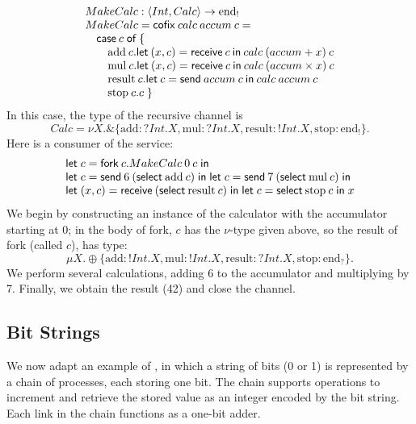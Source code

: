 \documentclass[orivec,envcountsame]{llncs}
\makeatletter
\newcommand{\with}{\mathbin\binampersand}
\newcommand{\gvout}[2]{{!#1.#2}}
\newcommand{\gvin}[2]{{?#1.#2}}
\newcommand{\uto}{\ensuremath{\rightarrow}}
\newcommand{\outterm}{\mathrm{end}_!}
\newcommand{\interm}{\mathrm{end}_?}
\newcommand{\mkwd}[1]{\mathsf{#1}}
\newcommand{\tkwd}[1]{\textsf{#1}}
\newcommand{\clabel}[1]{\mathrm{#1}}
\newcommand{\gvsend}[2]{\mkwd{send}\:#1\:#2}
\newcommand{\gvreceive}[1]{\mkwd{receive}\:#1}
\newcommand{\gvlet}[3]{\mkwd{let}\;#1 = #2\;\mkwd{in}\;#3}
\newcommand{\gvselect}[2]{\mkwd{select}\:#1\:#2}
\newcommand{\gvfork}[2]{\mkwd{fork}\:#1.#2}
\newcommand{\lrkwd}{\mkwd{cofix}}
\newcommand{\ba}{\begin{array}}
\newcommand{\ea}{\end{array}}
\newcommand{\bl}{\ba[t]{@{}l@{}}}
\newcommand{\el}{\ea}
\newcommand{\todo}[1]{{\noindent\small\color{red} \framebox{\parbox{\dimexpr\linewidth-2\fboxsep-2\fboxrule}{\textbf{TODO:} #1}}}}
\makeatother
\begin{document}
\[
\bl
MakeCalc : \langle Int, Calc \rangle \uto \outterm \\
MakeCalc = \lrkwd\:calc\:accum\:c = \\
\quad
  \bl
  \mkwd{case}\:c\;\mkwd{of}\:\{ \\
  \quad
    \bl
    \clabel{add}\:c.
      \bl
      \mkwd{let}\:(x,c) = \gvreceive{c} \: \mkwd{in}\:
      calc\:(accum + x)\:c \\
      \el \\
    \clabel{mul}\:c.
      \bl
      \mkwd{let}\:(x,c) = \gvreceive{c}\:\mkwd{in}\:
      calc\:(accum \times x)\:c \\
      \el \\
    \clabel{result}\:c.
      \bl
      \mkwd{let}\:c = \gvsend{accum}{c}\:\mkwd{in}\:
      calc\:accum\:c \\
      \el \\
    \clabel{stop}\:c.c \; \}
    \el \\
  \el \\
\el
\]
In this case, the type of the recursive channel is
\[
 Calc = \nu X. \with \{ \clabel{add}: \gvin{Int}{X},
                        \clabel{mul}: \gvin{Int}{X},
                        \clabel{result}: \gvout{Int}{X},
                        \clabel{stop}: \outterm \}.
\]%
Here is a consumer of the service:
\[
\bl
  \gvlet{c}{\gvfork{c}{MakeCalc\:0\:c}}{} \\
  \gvlet{c}{\gvsend{6}{(\gvselect{\clabel{add}}{c})}}{
  \gvlet{c}{\gvsend{7}{(\gvselect{\clabel{mul}}{c})}}{}} \\
  \gvlet{(x,c)}{\gvreceive{(\gvselect{\clabel{result}}{c})}}{
  \gvlet{c}{\gvselect{\clabel{stop}}{c}}{x}}
\el
\]
We begin by constructing an instance of the calculator with the accumulator starting at 0; in the
body of \tkwd{fork}, $c$ has the $\nu$-type given above, so the result of \tkwd{fork} (called
$c$), has type:
\[
\mu X. \oplus \{ \clabel{add}: \gvout{Int}{X}, \clabel{mul}: \gvout{Int}{X}, \clabel{result}: \gvin{Int}{X}, \clabel{stop}: \interm \}.
\]
We perform several calculations, adding 6 to the accumulator and multiplying by 7.  Finally, we
obtain the result (42) and close the channel.

\subsection{Bit Strings}
%

We now adapt an example of \citet{Toninho13}, in which a string of bits (0 or 1) is
represented by a chain of processes, each storing one bit. The chain supports operations to
increment and retrieve the stored value as an integer encoded by the bit string. Each link in the
chain functions as a one-bit adder.
\end{document}
